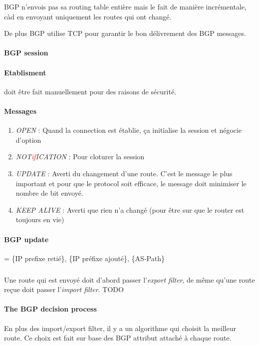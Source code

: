 BGP n'envois pas sa routing table entière mais le fait de manière incrémentale, càd en
envoyant uniquement les routes qui ont changé.

De plus BGP utilise TCP pour garantir le bon délivrement des BGP messages.

\paragraph{BGP session}

\paragraph{Etablisment} doit être fait manuellement pour des raisons de sécurité.

\paragraph{Messages}

\begin{enumerate}
    \item \textit{OPEN} : Quand la connection est établie, ça initialise la session et
        négocie d'option
    \item \textit{NOT\textcolor{red}{if}ICATION} : Pour cloturer la session
    \item \textit{UPDATE} : Averti du changement d'une route. C'est le message le plus important et pour que le protocol soit efficace, le message doit minimiser le nombre de bit envoyé.
    \item \textit{KEEP ALIVE} : Averti que rien n'a changé (pour être sur que le router
        est toujours en vie)
\end{enumerate}

\paragraph{BGP update} = \{IP prefixe retié\}, \{IP préfixe ajouté\}, \{AS-Path\}

\subparagraph{ } Une route qui est envoyé doit d'abord passer l'\textit{export filter},
de même qu'une route reçue doit passer l'\textit{import filter}.
TODO

\paragraph{The BGP decision process}
En plus des import/export filter, il y a un algorithme qui choisit la meilleur route.
Ce choix est fait sur base des BGP attribut attaché à chaque route.


